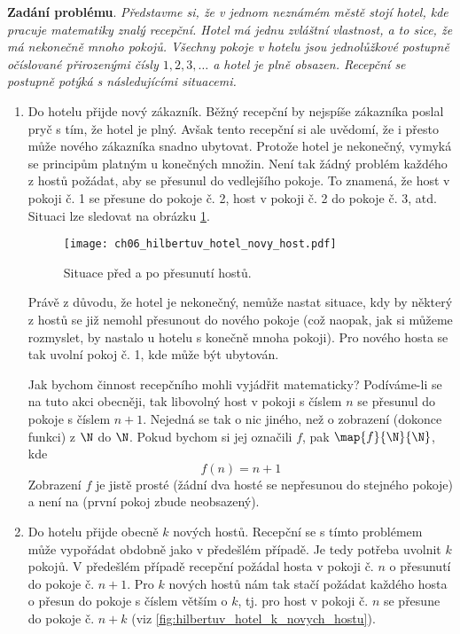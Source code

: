 \noindent\textbf{Zadání problému}. \textit{Představme si, že v jednom neznámém městě stojí hotel, kde pracuje matematiky znalý recepční. Hotel má jednu zvláštní vlastnost, a to sice, že má nekonečně mnoho pokojů. Všechny pokoje v hotelu jsou jednolůžkové postupně očíslované přirozenými čísly $1,2,3,\dots$ a hotel je plně obsazen. Recepční se postupně potýká s následujícími situacemi.}
\begin{enumerate}[label=\textit{(\roman*)}]
    \item\label{item:novy_host} Do hotelu přijde nový zákazník. Běžný recepční by nejspíše zákazníka poslal pryč s tím, že hotel je plný. Avšak tento recepční si ale uvědomí, že i přesto může nového zákazníka snadno ubytovat. Protože hotel je nekonečný, vymyká se principům platným u konečných množin. Není tak žádný problém každého z hostů požádat, aby se přesunul do vedlejšího pokoje. To znamená, že host v pokoji č. 1 se přesune do pokoje č. 2, host v pokoji č. 2 do pokoje č. 3, atd. Situaci lze sledovat na obrázku \ref{fig:hilbertuv_hotel_novy_host}.
    \begin{figure}[h]
        \centering
        \texttt{[image: ch06\_hilbertuv\_hotel\_novy\_host.pdf]}
        \caption{Situace před a po přesunutí hostů.}
        \label{fig:hilbertuv_hotel_novy_host}
    \end{figure}
    Právě z důvodu, že hotel je nekonečný, nemůže nastat situace, kdy by některý z hostů se již nemohl přesunout do nového pokoje (což naopak, jak si můžeme rozmyslet, by nastalo u hotelu s konečně mnoha pokoji). Pro nového hosta se tak uvolní pokoj č. 1, kde může být ubytován.\par
    Jak bychom činnost recepčního mohli vyjádřit matematicky? Podíváme-li se na tuto akci obecněji, tak libovolný host v pokoji s číslem $n$ se přesunul do pokoje s číslem $n+1$. Nejedná se tak o nic jiného, než o zobrazení (dokonce funkci) z $\N$ do $\N$. Pokud bychom si jej označili $f$, pak $\map{f}{\N}{\N}$, kde
    \begin{equation*}
        f(n)=n+1
    \end{equation*}
    Zobrazení $f$ je jistě prosté (žádní dva hosté se nepřesunou do stejného pokoje) a není na (první pokoj zbude neobsazený).
    \item\label{item:k_novych_hostu} Do hotelu přijde obecně $k$ nových hostů. Recepční se s tímto problémem může vypořádat obdobně jako v předešlém případě. Je tedy potřeba uvolnit $k$ pokojů. V předešlém případě recepční požádal hosta v pokoji č. $n$ o přesunutí do pokoje č. $n+1$. Pro $k$ nových hostů nám tak stačí požádat každého hosta o přesun do pokoje s číslem větším o $k$, tj. pro host v pokoji č. $n$ se přesune do pokoje č. $n+k$ (viz \ref{fig:hilbertuv_hotel_k_novych_hostu}).

\end{enumerate}
